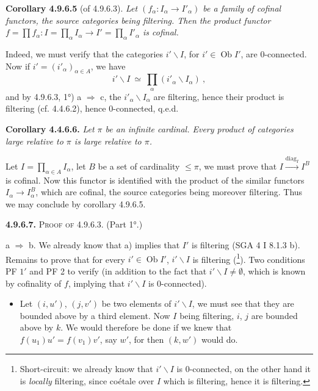 \documentclass[11pt]{article}
\newcommand{\msp}[1]{\marginpar{\footnotesize [#1]}}
\newcommand{\Ob}{\operatorname{Ob}}
\begin{document}
\textbf{Corollary 4.9.6.5} (of 4.9.6.3). \textit{Let $(f_\alpha : I_\alpha \longrightarrow I'_\alpha)$ be a family of cofinal functors, the source categories being filtering. Then the product functor $f = \prod f_\alpha : I = \prod_\alpha I_\alpha \longrightarrow I' = \prod_\alpha I'_\alpha$ is cofinal.}

Indeed, we must verify that the categories $i'\backslash I$, for $i' \in \Ob I'$, are 0-connected. Now if $i' = (i'_\alpha)_{\alpha \in A}$, we have
\[
i'\backslash I \ \simeq \ \prod_\alpha (i'_\alpha\backslash I_\alpha) \ ,
\]
and by 4.9.6.3, 1°) a $\Longrightarrow$ c, the $i'_\alpha\backslash I_\alpha$ are filtering, hence their product is filtering
\msp{page 228}
(cf. 4.4.6.2), hence 0-connected, q.e.d. %

\textbf{Corollary 4.4.6.6.} \textit{Let $\pi$ be an infinite cardinal. Every product of categories large relative to $\pi$ is large relative to $\pi$.} %

Let $I = \prod_{\alpha \in A} I_\alpha$, let $B$ be a set of cardinality $\leqslant \pi$, we must prove that $I \xrightarrow{\mathrm{diag}_I} I^B$ is cofinal. Now this functor is identified with the product of the similar functors $I_\alpha \longrightarrow I_\alpha^B$, which are cofinal, the source categories being moreover filtering. Thus we may conclude by corollary 4.9.6.5.

\textbf{4.9.6.7.} \textsc{Proof of} 4.9.6.3. (Part 1°.)

a $\Longrightarrow$ b. We already know that a) implies that $I'$ is filtering (SGA 4 I 8.1.3 b). Remains to prove that for every $i' \in \Ob I'$, $i'\backslash I$ is filtering (\footnote[103]{Short-circuit: we already know that $i'\backslash I$ is 0-connected, on the other hand it is \textit{locally} filtering, since coétale over $I$ which is filtering, hence it is filtering.}). Two conditions PF $1'$ and PF 2 to verify (in addition to the fact that $i'\backslash I \neq \emptyset$, which is known by cofinality of $f$, implying that $i'\backslash I$ is 0-connected).
\begin{itemize}[label={}]
\item[1)] Let $(i,u')$, $(j,v')$ be two elements of $i'\backslash I$, we must see that they are bounded above by a third element. Now $I$ being filtering, $i$, $j$ are bounded above by $k$. We would therefore be done if we knew that $f(u_1)u' = f(v_1)v'$, say $w'$, for then $(k,w')$ would do.
\end{itemize}
\end{document}
